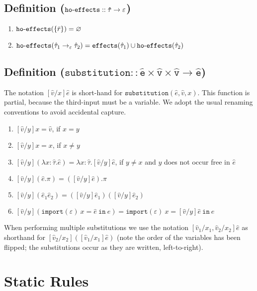 \documentclass{llncs}
\newcommand{\keywadj}[1]{\mathtt{#1}}
\newcommand{\keyw}[1]{\keywadj{#1}~}
\newcommand{\kw}[1]{\keyw{ #1 }}
\newcommand{\kwa}[1]{\keywadj{ #1 }}
\newcommand{\hyphen}{\hbox{-}}
\newcommand{\module}[0]{
\kwa{import}(\varepsilon)~x = \hat e~\kwa{in}~e
}
\begin{document}
\subsection*{Definition ($\kwa{ho \hyphen effects :: \hat \tau \rightarrow \varepsilon}$)}

\begin{enumerate}
	\item $\kwa{ho \hyphen effects}(\{ \bar r \}) = \varnothing$
	\item $\kwa{ho \hyphen effects}(\hat \tau_1 \rightarrow_{\varepsilon} \hat \tau_2) = \kwa{effects}(\hat \tau_1) \cup \kwa{ho \hyphen effects}(\hat \tau_2)$
\end{enumerate}

\subsection*{Definition ($\kwa{substitution :: \hat e \times \hat v \times \hat v \rightarrow \hat e}$)}

The notation $[\hat v/x]\hat e$ is short-hand for $\kwa{substitution}(\hat e, \hat v, x)$. This function is partial, because the third-input must be a variable. We adopt the usual renaming conventions to avoid accidental capture.

\begin{enumerate}
	\item $[\hat v/y]x = \hat v$, if $x = y$
	\item $[\hat v/y]x = x$, if $x \neq y$
	\item $[\hat v/y](\lambda x: \hat \tau.\hat e) = \lambda x: \hat \tau.[\hat v/y]\hat e$, if $y \neq x$ and $y$ does not occur free in $\hat e$
	\item $[\hat v/y](\hat e.\pi) = ([\hat v/y]\hat e).\pi$
	\item $[\hat v/y](\hat e_1 \hat e_2) = ([\hat v/y]\hat e_1) ([\hat v/y]\hat e_2)$ 	\item $[\hat v/y](\module) = \kwa{import}(\varepsilon)~x = [\hat v/y]\hat e~\kw{in} e$
\end{enumerate}

\noindent
When performing multiple substitutions we use the notation $[\hat v_1/x_1, \hat v_2/x_2]\hat e$ as shorthand for $[\hat v_2/x_2]([\hat v_1/x_1]\hat e)$ (note the order of the variables has been flipped; the substitutions occur as they are written, left-to-right).


\section{Static Rules}
\end{document}
